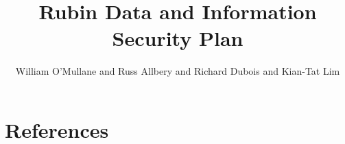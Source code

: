 \documentclass[OPS,lsstdraft,authoryear,toc]{lsstdoc}
\title{Rubin Data and Information Security Plan}
\author{%
William O'Mullane and Russ Allbery and Richard Dubois and Kian-Tat Lim
}
\date{\vcsDate}
\begin{document}
\maketitle


\appendix
\section{References} \label{sec:bib}
\renewcommand{\refname}{} %


%
\printglossaries
\end{document}
